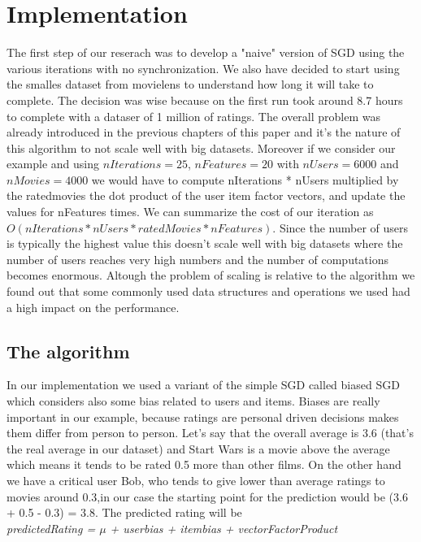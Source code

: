 \documentclass{sig-alternate-05-2015}
\begin{document}
\section{Implementation}
The first step of our reserach was to develop a "naive" version of
SGD using the various iterations with no synchronization. We also
have decided to start using the smalles dataset from movielens to understand
how long it will take to complete. The decision was wise because on the first
run took around 8.7 hours to complete with a dataser of 1 million of ratings.
The overall problem was already introduced in the previous chapters of this
paper and it's the nature of this algorithm to not scale well with big datasets.
Moreover if we consider our example and using $nIterations = 25$, $nFeatures = 20$
with $nUsers = 6000$ and $nMovies = 4000$ we would have to compute nIterations *
nUsers multiplied by the ratedmovies the dot product of the user item factor vectors, and update the values for
nFeatures times. We can summarize the cost of our iteration as $O(nIterations * nUsers * ratedMovies * nFeatures)$.
Since the number of users is typically the highest value this doesn't scale well with big datasets where the number of
users reaches very high numbers and the number of computations becomes enormous.
Altough the problem of scaling is relative to the algorithm we found out that
some commonly used data structures and operations we used had a high impact on
the performance.

\subsection{The algorithm}
In our implementation we used a variant of the simple SGD called biased SGD
which considers also some bias related to users and items.
Biases are really important in our example, because ratings are personal
driven decisions makes them differ from person to person. Let's say that
the overall average is 3.6 (that's the real average in our dataset) and
Start Wars is a movie above the average which means it tends to be rated
0.5 more than other films. On the other hand we have a critical user Bob,
who tends to give lower than average ratings to movies around 0.3,in our
case the starting point for the prediction would be (3.6 + 0.5 - 0.3) = 3.8.
The predicted rating will be\\
\textit{predictedRating = $\mu$ + userbias + itembias + vectorFactorProduct}
\end{document}
